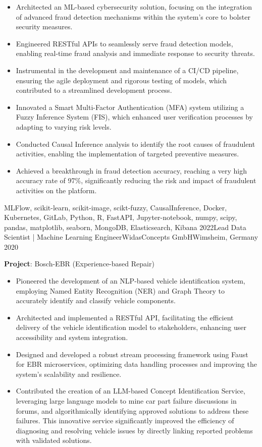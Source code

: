 \begin{experiences}
{\begin{itemize}
			\item Architected an ML-based cybersecurity solution, focusing on the integration of advanced fraud detection mechanisms within the system's core to bolster security measures.
			\item Engineered RESTful APIs to seamlessly serve fraud detection models, enabling real-time fraud analysis and immediate response to security threats.
			\item Instrumental in the development and maintenance of a CI/CD pipeline, ensuring the agile deployment and rigorous testing of models, which contributed to a streamlined development process.
			\item Innovated a Smart Multi-Factor Authentication (MFA) system utilizing a Fuzzy Inference System (FIS), which enhanced user verification processes by adapting to varying risk levels.
			\item Conducted Causal Inference analysis to identify the root causes of fraudulent activities, enabling the implementation of targeted preventive measures.
			\item Achieved a breakthrough in fraud detection accuracy, reaching a very high accuracy rate of 97\%, significantly reducing the risk and impact of fraudulent activities on the platform.
		\end{itemize}
	}
	{MLFlow, scikit-learn, scikit-image, scikt-fuzzy, CausalInference, Docker, Kubernetes, GitLab, Python, R,  FastAPI, Jupyter-notebook, numpy, scipy, pandas, matplotlib, seaborn, MongoDB, Elasticsearch, Kibana}
	\emptySeparator
	\experience
	{2022}{Lead Data Scientist | Machine Learning Engineer}{WidasConcepts GmbH}{Wimsheim, Germany}
	{2020} {
		\vspace{0.1cm}
		\textbf{Project}: Bosch-EBR (Experience-based Repair)
		\begin{itemize}
			\item Pioneered the development of an NLP-based vehicle identification system, employing Named Entity Recognition (NER) and Graph Theory to accurately identify and classify vehicle components.
			\item Architected and implemented a RESTful API, facilitating the efficient delivery of the vehicle identification model to stakeholders, enhancing user accessibility and system integration.
			\item Designed and developed a robust stream processing framework using Faust for EBR microservices, optimizing data handling processes and improving the system's scalability and resilience.
			\item Contributed the creation of an LLM-based Concept Identification Service, leveraging large language models to mine car part failure discussions in forums, and algorithmically identifying approved solutions to address these failures. This innovative service significantly improved the efficiency of diagnosing and resolving vehicle issues by directly linking reported problems with validated solutions.

\end{itemize}}
\end{experiences}
